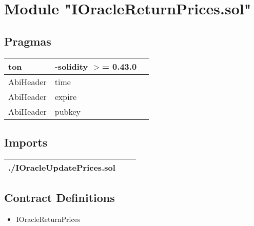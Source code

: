 
\section{Module "IOracleReturnPrices.sol"}


\subsection{Pragmas}


\noindent\begin{tabular}{|l|l|p{5cm}|}\hline
ton & -solidity $>$= 0.43.0 &\\\hline
AbiHeader &  time &\\\hline
AbiHeader &  expire &\\\hline
AbiHeader &  pubkey &\\\hline
\end{tabular}


\subsection{Imports}


\noindent\begin{tabular}{|l|l|p{5cm}|}\hline
./IOracleUpdatePrices.sol &\\\hline
\end{tabular}


\subsection{Contract Definitions}

\begin{itemize}
\item IOracleReturnPrices
\end{itemize}
